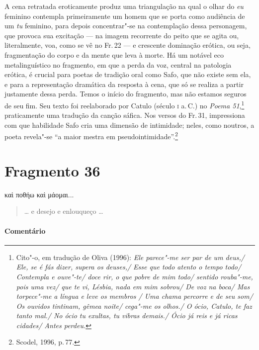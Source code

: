 {A cena retratada eroticamente produz uma triangulação na qual o olhar do \emph{eu}
feminino contempla primeiramente um homem que se porta como audiência de um
\emph{tu} feminino, para depois concentrar"-se na contemplação dessa
personagem, que provoca sua excitação --- na imagem recorrente do peito que se agita ou,
literalmente, voa, como se vê no Fr.\,22 --- e crescente dominação erótica, ou
seja, fragmentação do corpo e da mente que leva à morte. Há um notável eco
metalinguístico no fragmento, em que a perda da voz, central na patologia
erótica, é crucial para poetas de tradição oral como Safo, que não existe sem
ela, e para a representação dramática da resposta à cena, que só se realiza a
partir justamente dessa perda. Temos o início do fragmento, mas não estamos
seguros de seu fim. Seu texto foi reelaborado por Catulo (século \textsc{i}
a.\,C.) no \emph{Poema 51},\footnote{ Cito"-o, em tradução de Oliva (1996):
\emph{Ele parece"-me ser par de um deus,/ Ele, se é fás dizer, supera os
deuses,/ Esse que todo atento o tempo todo/ Contempla e ouve"-te/ doce rir, o
que pobre de mim todo/ sentido rouba"-me, pois uma vez/ que te vi, Lésbia,
nada em mim sobrou/ De voz na boca/ Mas torpece"-me a língua e leve os membros
/ Uma chama percorre e de seu som/ Os ouvidos tintinam, gêmea noite/ cega"-me
os olhos./ O ócio, Catulo, te faz tanto mal./ No ócio tu exultas, tu vibras
demais./ Ócio já reis e já ricas cidades/ Antes perdeu.}} praticamente uma
tradução da canção sáfica.
Nos versos do Fr.\,31, impressiona com que habilidade Safo cria uma dimensão de intimidade; neles, como noutros, a poeta revela"-se ``a maior mestra em pseudointimidade''.\footnote{Scodel, 1996, p.\,77.}}


\section{Fragmento 36}

\begin{gkverse}
καὶ ποθήω καὶ μάομαι...
\end{gkverse}

\begin{verse}
\ldots{} e desejo e enlouqueço \ldots{}
\end{verse}

\medskip

\paragraph{Comentário} 

